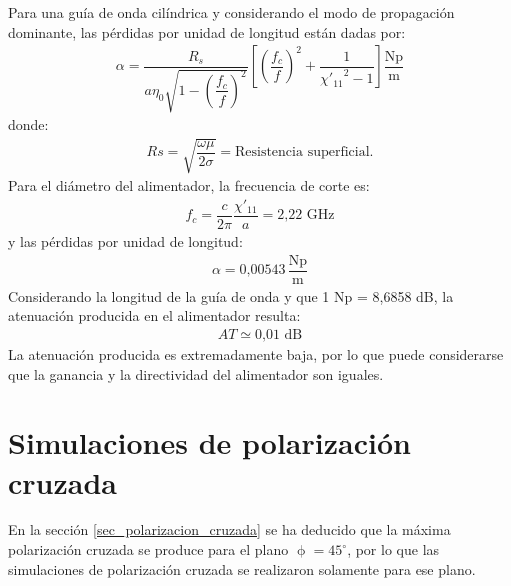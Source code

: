 Para una guía de onda cilíndrica y considerando el modo de propagación dominante, las pérdidas por unidad de longitud \cite{Balaniselectro} están dadas por:
\begin{align*}
\alpha = \dfrac{R_s}{a\eta_0\sqrt{1 - \left(\dfrac{f_c}{f}\right)^2}}\left[\!\left(\dfrac{f_c}{f}\right)^2 \!+ \dfrac{1}{{\chi '_{11}}^2  - 1}\right]\dfrac{\text{Np}}{\text{m}}
\end{align*}
donde:
\begin{align*}
Rs = \sqrt{\dfrac{\omega\mu}{2\sigma}} =\text{Resistencia superficial.}
\end{align*}
Para el diámetro del alimentador, la frecuencia de corte es:
\begin{align*}
f_c = \dfrac{c}{2\pi}\dfrac{\chi '_{11}}{a} = \text{2,22 GHz}
\end{align*}
y las pérdidas por unidad de longitud:
\begin{align*}
\alpha = \text{0,00543}\,\dfrac{\text{Np}}{\text{m}}
\end{align*}
Considerando la longitud de la guía de onda y que 1 Np = 8,6858 dB, la atenuación producida en el alimentador resulta:
\begin{align*}
AT \simeq \text{0,01 dB}
\end{align*}
La atenuación producida es extremadamente baja, por lo que puede considerarse que la ganancia y la directividad del alimentador son iguales.

\section{Simulaciones de polarización cruzada}
\label{sec_resultados_sim_pol_cru}

En la sección \ref{sec_polarizacion_cruzada} se ha deducido que la máxima polarización cruzada se produce para el plano $\upphi = 45^{\circ}$, por lo que las simulaciones de polarización cruzada se realizaron solamente para ese plano.

